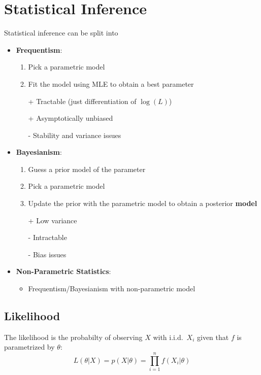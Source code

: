 \newcol{}
\section{Statistical Inference}
Statistical inference can be split into
\begin{itemize}
    \item \textbf{Frequentism}:
          \begin{enumerate}
              \item Pick a parametric model
              \item Fit the model using MLE to obtain a best parameter
          \end{enumerate}
          \newpar{}
          \begin{itemize}
              \item[+] Tractable (just differentiation of $\log(L)$)
              \item[+] Asymptotically unbiased
              \item[-] Stability and variance issues
          \end{itemize}
          \newpar{}
    \item \textbf{Bayesianism}:
          \begin{enumerate}
              \item Guess a prior model of the parameter
              \item Pick a parametric model
              \item Update the prior with the parametric model to obtain a posterior \textbf{model}
          \end{enumerate}
          \newpar{}
          \begin{itemize}
              \item[+] Low variance
              \item[-] Intractable
              \item[-] Bias issues
          \end{itemize}
    \item \textbf{Non-Parametric Statistics}:
          \begin{itemize}
              \item Frequentism/Bayesianism with non-parametric model
          \end{itemize}
\end{itemize}

\subsection{Likelihood}
The likelihood is the probabilty of observing $X$ with i.i.d.\ $X_i$ given that $f$ is parametrized by $\theta$:
\noindent\begin{equation*}
    L(\theta|X) = p(X|\theta) = \prod_{i=1}^{n} f(X_i|\theta)
\end{equation*}

